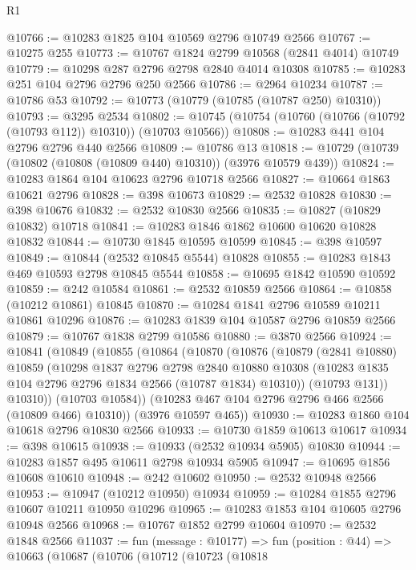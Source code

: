 \begin{lexlean}{R1}
\begin{coremodule}
@10766 := @10283 @1825 @104 @10569 @2796 @10749 @2566
@10767 := @10275 @255
@10773 := @10767 @1824 @2799 @10568 (@2841 @4014) @10749
@10779 := @10298 @287 @2796 @2798 @2840 @4014 @10308
@10785 := @10283 @251 @104 @2796 @2796 @250 @2566
@10786 := @2964 @10234
@10787 := @10786 @53
@10792 := @10773 (@10779 (@10785 (@10787 @250) @10310))
@10793 := @3295 @2534
@10802 := @10745 (@10754 (@10760 (@10766 (@10792 (@10793 @112)) @10310)) (@10703 @10566))
@10808 := @10283 @441 @104 @2796 @2796 @440 @2566
@10809 := @10786 @13
@10818 := @10729 (@10739 (@10802 (@10808 (@10809 @440) @10310)) (@3976 @10579 @439))
@10824 := @10283 @1864 @104 @10623 @2796 @10718 @2566
@10827 := @10664 @1863 @10621 @2796
@10828 := @398 @10673
@10829 := @2532 @10828
@10830 := @398 @10676
@10832 := @2532 @10830 @2566
@10835 := @10827 (@10829 @10832) @10718
@10841 := @10283 @1846 @1862 @10600 @10620 @10828 @10832
@10844 := @10730 @1845 @10595 @10599
@10845 := @398 @10597
@10849 := @10844 (@2532 @10845 @5544) @10828
@10855 := @10283 @1843 @469 @10593 @2798 @10845 @5544
@10858 := @10695 @1842 @10590 @10592
@10859 := @242 @10584
@10861 := @2532 @10859 @2566
@10864 := @10858 (@10212 @10861) @10845
@10870 := @10284 @1841 @2796 @10589 @10211 @10861 @10296
@10876 := @10283 @1839 @104 @10587 @2796 @10859 @2566
@10879 := @10767 @1838 @2799 @10586
@10880 := @3870 @2566
@10924 := @10841
    (@10849
      (@10855
        (@10864
          (@10870
            (@10876
              (@10879
                (@2841 @10880)
                @10859
                (@10298
                  @1837
                  @2796
                  @2798
                  @2840
                  @10880
                  @10308
                  (@10283 @1835 @104 @2796 @2796 @1834 @2566 (@10787 @1834) @10310))
                (@10793 @131))
              @10310))
          (@10703 @10584))
        (@10283 @467 @104 @2796 @2796 @466 @2566 (@10809 @466) @10310))
      (@3976 @10597 @465))
@10930 := @10283 @1860 @104 @10618 @2796 @10830 @2566
@10933 := @10730 @1859 @10613 @10617
@10934 := @398 @10615
@10938 := @10933 (@2532 @10934 @5905) @10830
@10944 := @10283 @1857 @495 @10611 @2798 @10934 @5905
@10947 := @10695 @1856 @10608 @10610
@10948 := @242 @10602
@10950 := @2532 @10948 @2566
@10953 := @10947 (@10212 @10950) @10934
@10959 := @10284 @1855 @2796 @10607 @10211 @10950 @10296
@10965 := @10283 @1853 @104 @10605 @2796 @10948 @2566
@10968 := @10767 @1852 @2799 @10604
@10970 := @2532 @1848 @2566
@11037 := fun (message : @10177) =>
  fun (position : @44) =>
  @10663
    (@10687
      (@10706
        (@10712
          (@10723
            (@10818

\end{coremodule}
\end{lexlean}
